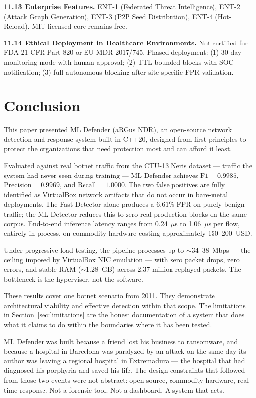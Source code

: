 \documentclass[11pt,a4paper]{article}
\begin{document}
\textbf{11.13 Enterprise Features.} ENT-1 (Federated Threat Intelligence), ENT-2 (Attack
Graph Generation), ENT-3 (P2P Seed Distribution), ENT-4 (Hot-Reload). MIT-licensed core
remains free.

\textbf{11.14 Ethical Deployment in Healthcare Environments.} Not certified for FDA 21 CFR
Part 820 or EU MDR 2017/745. Phased deployment: (1) 30-day monitoring mode with human
approval; (2) TTL-bounded blocks with SOC notification; (3) full autonomous blocking after
site-specific FPR validation.

\section{Conclusion}

This paper presented ML Defender (aRGus NDR), an open-source network detection and response
system built in C++20, designed from first principles to protect the organizations that need
protection most and can afford it least.

Evaluated against real botnet traffic from the CTU-13 Neris dataset --- traffic the system
had never seen during training --- ML Defender achieves $\text{F1} = 0.9985$,
$\text{Precision} = 0.9969$, and $\text{Recall} = 1.0000$. The two false positives are fully
identified as VirtualBox network artifacts that do not occur in bare-metal deployments. The
Fast Detector alone produces a 6.61\% FPR on purely benign traffic; the ML Detector reduces
this to zero real production blocks on the same corpus. End-to-end inference latency ranges
from 0.24~$\mu$s to 1.06~$\mu$s per flow, entirely in-process, on commodity hardware costing
approximately 150--200~USD.

Under progressive load testing, the pipeline processes up to ${\sim}$34--38~Mbps --- the
ceiling imposed by VirtualBox NIC emulation --- with zero packet drops, zero errors, and
stable RAM (${\sim}$1.28~GB) across 2.37 million replayed packets. The bottleneck is the
hypervisor, not the software.

These results cover one botnet scenario from 2011. They demonstrate architectural viability
and effective detection within that scope. The limitations in Section~\ref{sec:limitations}
are the honest documentation of a system that does what it claims to do within the boundaries
where it has been tested.

ML Defender was built because a friend lost his business to ransomware, and because a
hospital in Barcelona was paralyzed by an attack on the same day its author was leaving a
regional hospital in Extremadura --- the hospital that had diagnosed his porphyria and saved
his life. The design constraints that followed from those two events were not abstract:
open-source, commodity hardware, real-time response. Not a forensic tool. Not a dashboard. A
system that acts.
\end{document}
